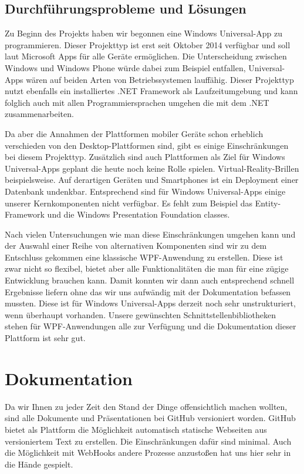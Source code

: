 \documentclass[12pt]{article}
\begin{document}
\subsection{Durchführungsprobleme und Lösungen}

Zu Beginn des Projekts haben wir begonnen eine Windows Universal-App zu programmieren. Dieser Projekttyp ist erst seit Oktober 2014 verfügbar und soll laut Microsoft Apps für alle Geräte ermöglichen. Die Unterscheidung zwischen Windows und Windows Phone würde dabei zum Beispiel entfallen, Universal-Apps wären auf beiden Arten von Betriebssystemen lauffähig. Dieser Projekttyp nutzt ebenfalls ein installiertes .NET Framework als Laufzeitumgebung und kann folglich auch mit allen Programmiersprachen umgehen die mit dem .NET zusammenarbeiten.
\newline

Da aber die Annahmen der Plattformen mobiler Geräte schon erheblich verschieden von den Desktop-Plattformen sind, gibt es einige Einschränkungen bei diesem Projekttyp. Zusätzlich sind auch Plattformen als Ziel für Windows Universal-Apps geplant die heute noch keine Rolle spielen. Virtual-Reality-Brillen beispielsweise. Auf derartigen Geräten und Smartphones ist ein Deployment einer Datenbank undenkbar. Entsprechend sind für Windows Universal-Apps einige unserer Kernkomponenten nicht verfügbar. Es fehlt zum Beispiel das Entity-Framework und die Windows Presentation Foundation classes.
\newline

Nach vielen Untersuchungen wie man diese Einschränkungen umgehen kann und der Auswahl einer Reihe von alternativen Komponenten sind wir zu dem Entschluss gekommen eine klassische WPF-Anwendung zu erstellen. Diese ist zwar nicht so flexibel, bietet aber alle Funktionalitäten die man für eine zügige Entwicklung brauchen kann. Damit konnten wir dann auch entsprechend schnell Ergebnisse liefern ohne das wir uns aufwändig mit der Dokumentation befassen mussten. Diese ist für Windows Universal-Apps derzeit noch sehr unstrukturiert, wenn überhaupt vorhanden. Unsere gewünschten Schnittstellenbibliotheken stehen für WPF-Anwendungen alle zur Verfügung und die Dokumentation dieser Plattform ist sehr gut.

\newpage
\section{Dokumentation}

Da wir Ihnen zu jeder Zeit den Stand der Dinge offensichtlich machen wollten, sind alle Dokumente und Präsentationen bei GitHub versioniert worden. GitHub bietet als Plattform die Möglichkeit automatisch statische Webseiten aus versioniertem Text zu erstellen. Die Einschränkungen dafür sind minimal. Auch die Möglichkeit mit WebHooks andere Prozesse anzustoßen hat uns hier sehr in die Hände gespielt.
\newline
\end{document}
